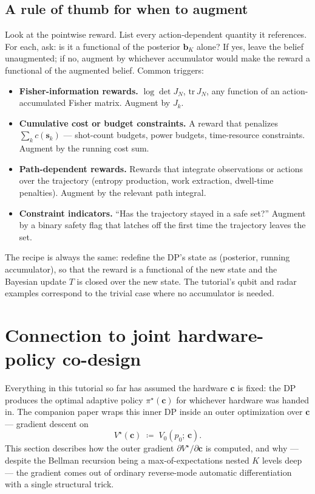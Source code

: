 \documentclass[11pt]{article}
\newcommand{\bc}{\bm{c}}
\newcommand{\bs}{\bm{s}}
\newcommand{\bb}{\bm{b}}
\begin{document}
\subsection{A rule of thumb for when to augment}

Look at the pointwise reward.  List every action-dependent quantity it references.  For each, ask: is it a functional of the posterior $\bb_K$ alone?  If yes, leave the belief unaugmented; if no, augment by whichever accumulator would make the reward a functional of the augmented belief.  Common triggers:

\begin{itemize}[nosep, leftmargin=*]
\item \textbf{Fisher-information rewards.}  $\log \det J_N$, $\mathrm{tr}\, J_N$, any function of an action-accumulated Fisher matrix.  Augment by $J_k$.
\item \textbf{Cumulative cost or budget constraints.}  A reward that penalizes $\sum_k c(\bs_k)$ --- shot-count budgets, power budgets, time-resource constraints.  Augment by the running cost sum.
\item \textbf{Path-dependent rewards.}  Rewards that integrate observations or actions over the trajectory (entropy production, work extraction, dwell-time penalties).  Augment by the relevant path integral.
\item \textbf{Constraint indicators.}  ``Has the trajectory stayed in a safe set?''  Augment by a binary safety flag that latches off the first time the trajectory leaves the set.
\end{itemize}

The recipe is always the same: redefine the DP's state as (posterior, running accumulator), so that the reward is a functional of the new state and the Bayesian update $T$ is closed over the new state.  The tutorial's qubit and radar examples correspond to the trivial case where no accumulator is needed.

\section{Connection to joint hardware-policy co-design}
\label{sec:joint_dp}

Everything in this tutorial so far has assumed the hardware $\bc$ is fixed: the DP produces the optimal adaptive policy $\pi^\star(\bc)$ for whichever hardware was handed in.  The companion paper wraps this inner DP inside an outer optimization over $\bc$ --- gradient descent on
\begin{equation}
V^\star(\bc) \;\coloneqq\; V_0(p_0;\, \bc).
\end{equation}
This section describes how the outer gradient $\partial V^\star / \partial \bc$ is computed, and why --- despite the Bellman recursion being a max-of-expectations nested $K$ levels deep --- the gradient comes out of ordinary reverse-mode automatic differentiation with a single structural trick.
\end{document}
